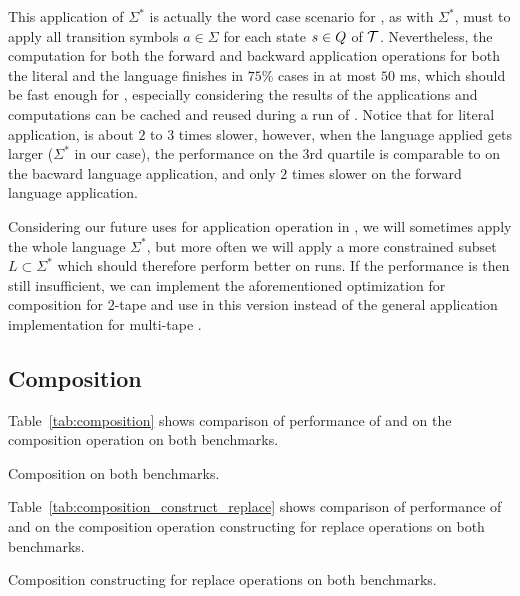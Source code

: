This application of $\Sigma^*$ is actually the word case scenario for \mata, as with $\Sigma^*$, \mata must to apply all transition symbols $a \in \Sigma$ for each state $s \in Q$ of $\mathcal{T}$.
Nevertheless, the computation for both the forward and backward application operations for both the literal and the language finishes in $75\%$ cases in at most $50$ ms, which should be fast enough for \noodler, especially considering the results of the applications and computations can be cached and reused during a run of \noodler.
Notice that for literal application, \mata is about $2$ to $3$ times slower, however, when the language applied gets larger ($\Sigma^*$ in our case), the performance on the 3rd quartile is comparable to \mona on the bacward language application, and only $2$ times slower on the forward language application.

Considering our future uses for application operation in \noodler, we will sometimes apply the whole language $\Sigma^*$, but more often we will apply a more constrained subset $L \subset \Sigma^*$ which should therefore perform better on \noodler runs.
If the performance is then still insufficient, we can implement the aforementioned optimization for composition for $2$-tape \nfts and use in \noodler this version instead of the general application implementation for multi-tape \nfts.

\subsection{Composition}

Table~\ref{tab:composition} shows comparison of performance of \mata and \mona on the composition operation on both benchmarks.

\begin{table}[ht]
  \centering
  
  \caption{
    Composition on both benchmarks.
  }
  \label{tab:composition}
\end{table}

Table~\ref{tab:composition_construct_replace} shows comparison of performance of \mata and \mona on the composition operation constructing \nfts for replace operations on both benchmarks.

\begin{table}[ht]
  \centering
  
  \caption{
    Composition constructing \nfts for replace operations on both benchmarks.
  }
  \label{tab:composition_construct_replace}
\end{table}

